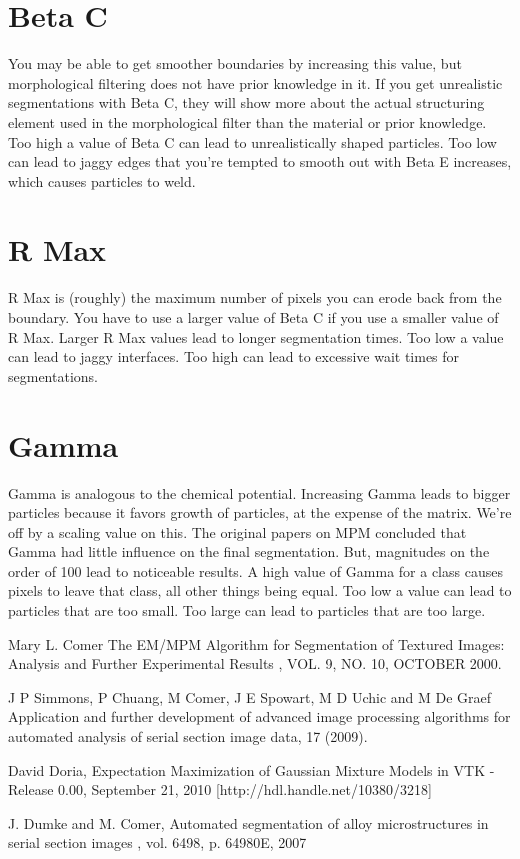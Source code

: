 \documentclass[12pt,oneside]{book}
\begin{document}
\section{Beta C}
You may be able to get smoother boundaries by increasing this value, but morphological filtering does not have prior knowledge in it. If you get unrealistic segmentations with Beta C, they will show more about the actual structuring element used in the morphological filter than the material or prior knowledge. Too high a value of Beta C can lead to unrealistically shaped particles. Too low can lead to jaggy edges that you're tempted to smooth out with Beta E increases, which causes particles to weld.
\section{R Max}
R Max is (roughly) the maximum number of pixels you can erode back from the boundary. You have to use a larger value of Beta C if you use a smaller value of R Max. Larger R Max values lead to longer segmentation times. Too low a value can lead to jaggy interfaces. Too high can lead to excessive wait times for segmentations.
\section{Gamma}
Gamma is analogous to the chemical potential. Increasing Gamma leads to bigger particles because it favors growth of particles, at the expense of the matrix. We're off by a scaling value on this. The original papers on MPM concluded that Gamma had little influence on the final segmentation. But, magnitudes on the order of 100 lead to noticeable results. A high value of Gamma for a class causes pixels to leave that class, all other things being equal. Too low a value can lead to particles that are too small. Too large can lead to particles that are too large.

\newpage
%
%

\begin{thebibliography}{4}

Mary L. Comer
\newblock The EM/MPM Algorithm for Segmentation of Textured Images: Analysis and Further Experimental Results
, VOL. 9, NO. 10, OCTOBER 2000.


J P Simmons, P Chuang, M Comer, J E Spowart, M D Uchic and M De Graef
\newblock Application and further development of advanced image processing algorithms for automated analysis of serial section image data, 
 17 (2009). 


David Doria, 
\newblock Expectation Maximization of Gaussian Mixture Models in VTK - Release 0.00, September 21, 2010
 [http://hdl.handle.net/10380/3218] 


J. Dumke and M. Comer, 
\newblock Automated segmentation of alloy microstructures in serial section images
, vol. 6498, p. 64980E, 2007

\end{thebibliography}
% 

\printindex
\end{document}
